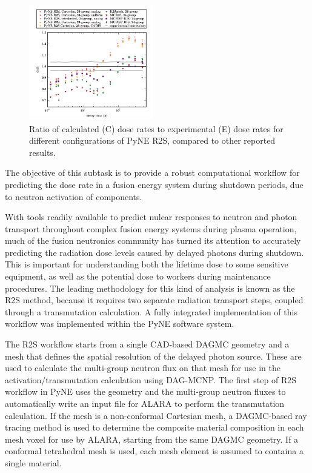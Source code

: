 \begin{figure}
\centering
\includegraphics[width=0.48\textwidth]{imgs/r2s-validation.png}
\caption{\label{fig:r2s-validation}Ratio of calculated (C) dose rates to
  experimental (E) dose rates for different configurations of PyNE R2S,
  compared to other reported results.}
\end{figure}

The objective of this subtask is to provide a robust computational workflow
for predicting the dose rate in a fusion energy system during shutdown
periods, due to neutron activation of components.

With tools readily available to predict nulear responses to neutron and photon
transport throughout complex fusion energy systems during plasma operation,
much of the fusion neutronics community has turned its attention to accurately
predicting the radiation dose levels caused by delayed photons during
shutdown.  This is important for understanding both the lifetime dose to some
sensitive equipment, as well as the potential dose to workers during
maintenance procedures.  The leading methodology for this kind of analysis is
known as the \gls{R2S} method, because it requires two separate radiation
transport steps, coupled through a transmutation
calculation\cite{various_r2s}.  A fully integrated implementation of this
workflow was implemented within the PyNE software system\cite{pyne}.

The \gls{R2S} workflow starts from a single CAD-based \gls{DAGMC} geometry and
a mesh that defines the spatial resolution of the delayed photon source.
These are used to calculate the multi-group neutron flux on that mesh for use
in the activation/transmutation calculation using DAG-MCNP.  The first step of
\gls{R2S} workflow in PyNE uses the geometry and the multi-group neutron
fluxes to automatically write an input file for ALARA to perform the
transmutation calculation.  If the mesh is a non-conformal Cartesian mesh, a
\gls{DAGMC}-based ray tracing method is used to determine the composite
material composition in each mesh voxel for use by ALARA, starting from the
same \gls{DAGMC} geometry.  If a conformal tetrahedral mesh is used, each mesh
element is assumed to containa a single material.

